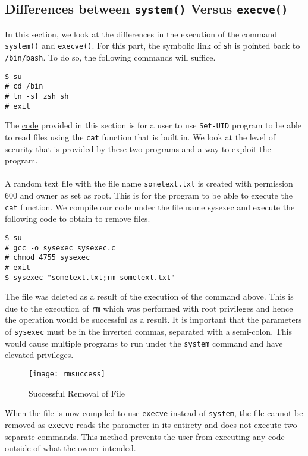 \documentclass[a4paper,12pt]{article}
\newcommand{\setuid}{\texttt{Set-UID} }
\begin{document}
\subsection{Differences between \texttt{system()} Versus \texttt{execve()}}
In this section, we look at the differences in the execution of the command \texttt{system()} and \texttt{execve()}. For this part, the symbolic link of \texttt{sh} is pointed back to \texttt{/bin/bash}. To do so, the following commands will suffice.
\begin{verbatim}
$ su
# cd /bin
# ln -sf zsh sh
# exit
\end{verbatim}
The \hyperref[Appsec:sysexec]{code} provided in this section is for a user to use \setuid program to be able to read files using the \texttt{cat} function that is built in. We look at the level of security that is provided by these two programs and a way to exploit the program.\\\\A random text file with the file name \texttt{sometext.txt} is created with permission 600 and owner as set as root. This is for the program to be able to execute the \texttt{cat} function. We compile our code under the file name sysexec and execute the following code to obtain to remove files.
\begin{verbatim}
$ su
# gcc -o sysexec sysexec.c
# chmod 4755 sysexec
# exit
$ sysexec "sometext.txt;rm sometext.txt"
\end{verbatim}
The file was deleted as a result of the execution of the command above. This is due to the execution of \texttt{rm} which was performed with root privileges and hence the operation would be successful as a result. It is important that the parameters of \texttt{sysexec} must be in the inverted commas, separated with a semi-colon. This would cause multiple programs to run under the \texttt{system} command and have elevated privileges.
\begin{figure}[H]
	\centering
	\texttt{[image: rmsuccess]}
	\caption{Successful Removal of File}
	\label{fig:rmsuccess}
\end{figure}
\noindent When the file is now compiled to use \texttt{execve} instead of \texttt{system}, the file cannot be removed as \texttt{execve} reads the parameter in its entirety and does not execute two separate commands. This method prevents the user from executing any code outside of what the owner intended.
\end{document}
